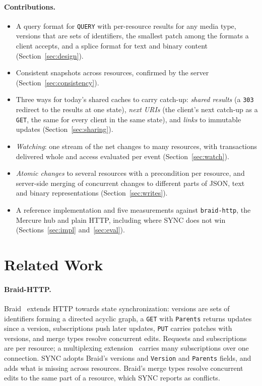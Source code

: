 \documentclass[11pt,a4paper]{article}
\begin{document}
\paragraph{Contributions.}
\begin{itemize}
  \item A query format for \texttt{QUERY} with per-resource results for any media type, versions that are sets of identifiers, the smallest patch among the formats a client accepts, and a splice format for text and binary content (Section~\ref{sec:design}).
  \item Consistent snapshots across resources, confirmed by the server (Section~\ref{sec:consistency}).
  \item Three ways for today's shared caches to carry catch-up: \emph{shared results} (a \texttt{303} redirect to the results at one state), \emph{next URIs} (the client's next catch-up as a \texttt{GET}, the same for every client in the same state), and \emph{links} to immutable updates (Section~\ref{sec:sharing}).
  \item \emph{Watching}: one stream of the net changes to many resources, with transactions delivered whole and access evaluated per event (Section~\ref{sec:watch}).
  \item \emph{Atomic changes} to several resources with a precondition per resource, and server-side merging of concurrent changes to different parts of JSON, text and binary representations (Section~\ref{sec:writes}).
  \item A reference implementation and five measurements against \texttt{braid-http}, the Mercure hub and plain HTTP, including where SYNC does not win (Sections~\ref{sec:impl} and~\ref{sec:eval}).
\end{itemize}

\section{Related Work}
\label{sec:related}

\paragraph{Braid-HTTP.}
Braid~\cite{braid,braidversions} extends HTTP towards state synchronization: versions are sets of identifiers forming a directed acyclic graph, a \texttt{GET} with \texttt{Parents} returns updates since a version, subscriptions push later updates, \texttt{PUT} carries patches with versions, and merge types resolve concurrent edits. Requests and subscriptions are per resource; a multiplexing extension~\cite{braidmux} carries many subscriptions over one connection. SYNC adopts Braid's versions and \texttt{Version} and \texttt{Parents} fields, and adds what is missing across resources. Braid's merge types resolve concurrent edits to the same part of a resource, which SYNC reports as conflicts.
\end{document}
